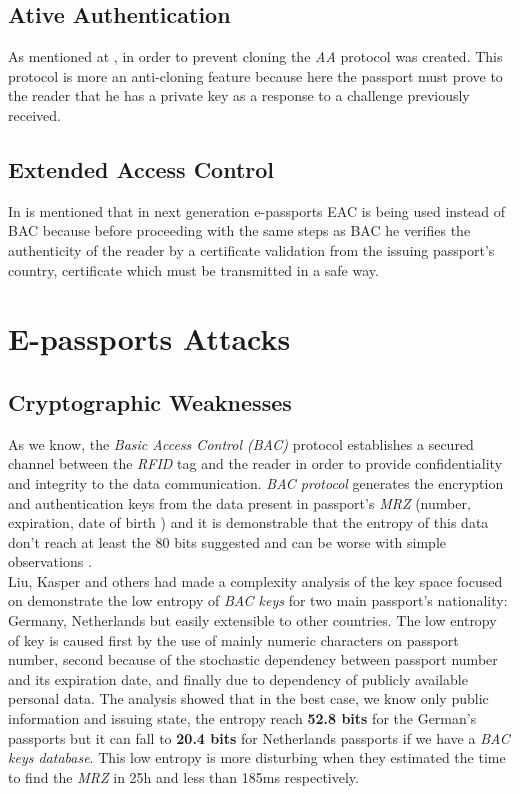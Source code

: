 \documentclass{acm_proc_article-sp}
\begin{document}
\subsection{Ative Authentication}
As mentioned at \cite{JUAR2005}, in order to prevent cloning the \textit{AA} protocol was created. 
This protocol is more an anti-cloning feature because here the passport must prove 
to the reader that he has a private key as a response to a challenge previously received.

\subsection{Extended Access Control}
In \cite{NM12} is mentioned that in next generation e-passports EAC is being used 
instead of BAC because before proceeding with the same steps as BAC he verifies the 
authenticity of the reader by a certificate validation from the issuing passport’s country, 
certificate which must be transmitted in a safe way.


\section{E-passports Attacks}
\label{sec:sec3}

\subsection{Cryptographic Weaknesses}
\label{subsec:crypt}
As we know, the \textit{Basic Access Control (BAC)} protocol establishes a secured channel between 
the \textit{RFID} tag and the reader in order to provide confidentiality and integrity to the 
data communication. \textit{BAC protocol} generates the encryption and authentication keys from the data 
present in passport's \textit {MRZ} (number, expiration, date of birth ) and it is demonstrable 
that the entropy of this data don’t reach at least the 80 bits suggested and can be worse 
with simple observations \cite{JUAR2005} \cite{02COPA}.\\
Liu, Kasper and others \cite{02COPA} had made a complexity analysis of the key space focused on 
demonstrate the low entropy of \textit{BAC keys} for two main passport’s nationality: Germany, 
Netherlands but easily extensible to other countries. The low entropy of key is caused 
first by the use of mainly numeric characters on passport number, 
second because of the stochastic dependency between passport number and its expiration 
date, and finally due to dependency of publicly available personal data. The analysis 
showed that in the best case, we know only public information and issuing state, the 
entropy reach \textbf {52.8 bits} for the German’s passports but it can fall to \textbf {20.4 bits} for 
Netherlands passports if we have a \textit{BAC keys database}. This low entropy is more disturbing 
when they estimated the time to find the \textit{MRZ} in 25h and less than 185ms 
respectively.
\end{document}
